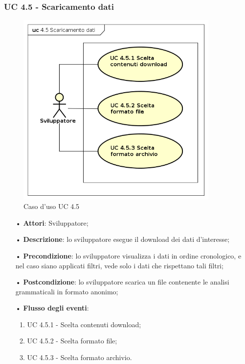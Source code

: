 \subsubsection{UC 4.5 - Scaricamento dati}
\begin{figure}[H]
	\centering
	\includegraphics[width=10cm, keepaspectratio]{img/UC450.png} 
	\caption{Caso d'uso UC 4.5}\label{fig:450}
\end{figure}
\begin{itemize}
	\item[•]\textbf{Attori}: Sviluppatore;
	\item[•]\textbf{Descrizione}: lo sviluppatore esegue il download dei dati d'interesse;
	\item[•]\textbf{Precondizione}: lo sviluppatore visualizza i dati in ordine cronologico, e nel caso siano applicati filtri, vede solo i dati che rispettano tali filtri;
	\item[•]\textbf{Postcondizione}: lo sviluppatore scarica un file contenente le analisi grammaticali in formato anonimo;
	\item[•]\textbf{Flusso degli eventi}:
	\begin{enumerate}
		\item UC 4.5.1 - Scelta contenuti download;
		\item UC 4.5.2 - Scelta formato file;
		\item UC 4.5.3 - Scelta formato archivio.
	\end{enumerate}
\end{itemize}


